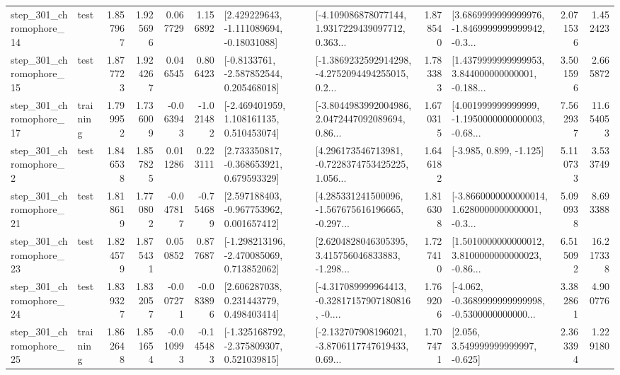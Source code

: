 \begin{tabular}{llrrrrllrlrr}
  step\_301\_chromophore\_14 &      test &      1.857967 &    1.925696 &      0.067729 &  1.156892 &    [2.429229643, -1.111089694, -0.18031088] &  [-4.109086878077144, 1.9317229439097712, 0.363... &       1.878540 &  [3.6869999999999976, -1.8469999999999942, -0.3... &            2.071536 &          1.452423 \\
  step\_301\_chromophore\_15 &      test &      1.877723 &    1.924267 &      0.046545 &  0.806423 &     [-0.8133761, -2.587852544, 0.205468018] &  [-1.3869232592914298, -4.2752094494255015, 0.2... &       1.783383 &  [1.4379999999999953, 3.844000000000001, -0.188... &            3.501596 &          2.665872 \\
  step\_301\_chromophore\_17 &  training &      1.799952 &    1.736009 &     -0.063943 & -1.021482 &    [-2.469401959, 1.108161135, 0.510453074] &  [-3.8044983992004986, 2.0472447092089694, 0.86... &       1.670315 &  [4.001999999999999, -1.1950000000000003, -0.68... &            7.562937 &         11.654053 \\
   step\_301\_chromophore\_2 &      test &      1.846538 &    1.857825 &      0.011286 &  0.223111 &    [2.733350817, -0.368653921, 0.679593329] &  [4.296173546713981, -0.7228374753425225, 1.056... &       1.646182 &                            [-3.985, 0.899, -1.125] &            5.110733 &          3.533749 \\
  step\_301\_chromophore\_21 &      test &      1.818619 &    1.770802 &     -0.047817 & -0.754689 &    [2.597188403, -0.967753962, 0.001657412] &  [4.285331241500096, -1.567675616196665, -0.297... &       1.816308 &  [-3.8660000000000014, 1.6280000000000001, -0.3... &            5.090938 &          8.693388 \\
  step\_301\_chromophore\_23 &      test &      1.824579 &    1.875431 &      0.050852 &  0.877687 &   [-1.298213196, -2.470085069, 0.713852062] &  [2.6204828046305395, 3.415756046833883, -1.298... &       1.727410 &  [1.5010000000000012, 3.8100000000000023, -0.86... &            6.515092 &         16.217338 \\
  step\_301\_chromophore\_24 &      test &      1.839327 &    1.832057 &     -0.007271 & -0.083896 &     [2.606287038, 0.231443779, 0.498403414] &  [-4.317089999964413, -0.32817157907180816, -0.... &       1.769206 &  [-4.062, -0.3689999999999998, -0.5300000000000... &            3.382861 &          4.900776 \\
  step\_301\_chromophore\_25 &  training &      1.862648 &    1.851654 &     -0.010993 & -0.145483 &   [-1.325168792, -2.375809307, 0.521039815] &  [-2.132707908196021, -3.8706117747619433, 0.69... &       1.707471 &                 [2.056, 3.549999999999997, -0.625] &            2.363394 &          1.229180 \\

\end{tabular}
